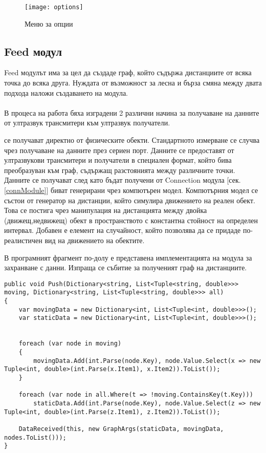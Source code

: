 \begin{figure}
   \centerline{\texttt{[image: options]}}
    \caption{Меню за опции}
    \label{fig:options}
\end{figure}

\pagebreak

\subsection{Feed модул}
Feed модулът има за цел да създаде граф, който съдържа дистанциите от всяка точка до всяка друга. Нуждата от възможност за лесна и бърза смяна между двата подхода наложи създаването на модула.\\\\
В процеса на работа бяха изградени 2 различни начина за получаване на данните от ултразвук трансмитери към ултразвук получатели. 
\begin{enumerate}
     се получават директно от физическите обекти. Стандартното измерване се случва чрез получаване на данните през сериен порт. Данните се предоставят от ултразвукови трансмитери и получатели в специален формат, който бива преобразуван към граф, съдържащ разстоянията между различните точки. Данните се получават след като бъдат получени от Connection модула [сек. \ref{connModule}]
     биват генерирани чрез компютърен модел. Компютърния модел се състои от генератор на дистанции, който симулира движението на реален обект. Това се постига чрез манипулация на дистанцията между двойка (движещ,недвижещ) обект в пространството с константна стойност на определен интервал. Добавен е елемент на случайност, който позволява да се придаде по-реалистичен вид на движението на обектите.
\end{enumerate}

В програмният фрагмент по-долу е представена имплементацията на модула за захранване с данни. Изпраща се събитие за полученият граф на дистанциите.
\begin{lstlisting}
public void Push(Dictionary<string, List<Tuple<string, double>>> moving, Dictionary<string, List<Tuple<string, double>>> all)
{
    var movingData = new Dictionary<int, List<Tuple<int, double>>>();
    var staticData = new Dictionary<int, List<Tuple<int, double>>>();


    foreach (var node in moving)
    {
        movingData.Add(int.Parse(node.Key), node.Value.Select(x => new Tuple<int, double>(int.Parse(x.Item1), x.Item2)).ToList());
    }

    foreach (var node in all.Where(t => !moving.ContainsKey(t.Key)))
        staticData.Add(int.Parse(node.Key), node.Value.Select(z => new Tuple<int, double>(int.Parse(z.Item1), z.Item2)).ToList());

    DataReceived(this, new GraphArgs(staticData, movingData, nodes.ToList()));
}
\end{lstlisting}

